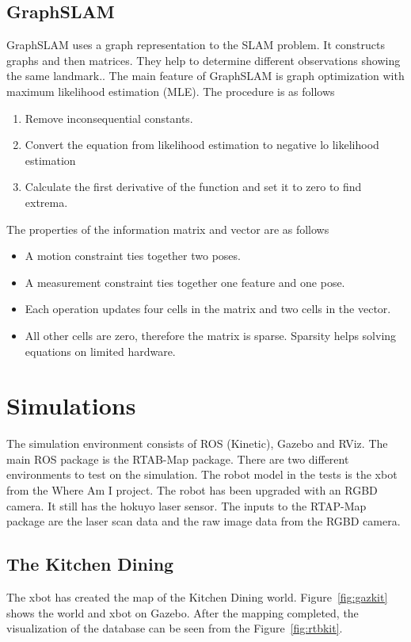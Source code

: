 \documentclass[10pt,journal,compsoc]{IEEEtran}
\begin{document}
\subsection{GraphSLAM}
GraphSLAM uses a graph representation to the SLAM problem. It constructs graphs and then matrices. They help to determine different observations showing the same landmark.\cite{wiki:gslam}. The main feature of GraphSLAM is graph optimization with maximum likelihood estimation (MLE). The procedure is as follows
\begin{enumerate}
  \item Remove inconsequential constants.
  \item Convert the equation from likelihood estimation to negative lo likelihood estimation
  \item Calculate the first derivative of the function and set it to zero to find extrema.
\end{enumerate}
The properties of the information matrix and vector are as follows
\begin{itemize}
\item A motion constraint ties together two poses.
\item A measurement constraint ties together one feature and one pose.
\item Each operation updates four cells in the matrix and two cells in the vector.
\item All other cells are zero, therefore the matrix is sparse. Sparsity helps solving equations on limited hardware.
\end{itemize}

\section{Simulations}
The simulation environment consists of ROS (Kinetic), Gazebo and RViz. The main ROS package is the RTAB-Map package. There are two different environments to test on the simulation. The robot model in the tests is the xbot from the Where Am I project. The robot has been upgraded with an RGBD camera. It still has the hokuyo laser sensor. The inputs to the RTAP-Map package are the laser scan data and the raw image data from the RGBD camera.

\subsection{The Kitchen Dining}
The xbot has created the map of the Kitchen Dining world. Figure~\ref{fig:gazkit} shows the world and xbot on Gazebo. After the mapping completed, the visualization of the database can be seen from the Figure~\ref{fig:rtbkit}.
\end{document}
